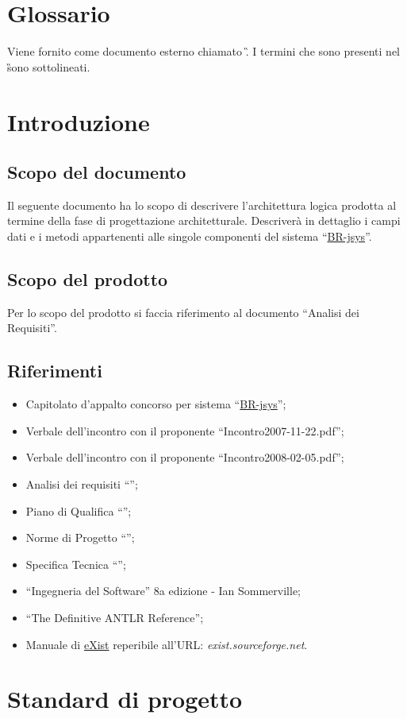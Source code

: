 \chapter*{Glossario}
Viene fornito come documento esterno chiamato \G. I termini che sono presenti nel \G sono sottolineati.

\chapter{Introduzione}
\section{Scopo del documento}
Il seguente documento ha lo scopo di descrivere l'architettura logica prodotta al termine della fase di progettazione architetturale. Descriver\`a in dettaglio i campi dati e i metodi appartenenti alle singole componenti del sistema ``\underline{BR-jsys}''.
\section{Scopo del prodotto}
Per lo scopo del prodotto si faccia riferimento al documento ``Analisi dei Requisiti''.

\section{Riferimenti}
\begin{itemize}
\item Capitolato d'appalto concorso per sistema ``\underline{BR-jsys}'';
\item Verbale dell'incontro con il proponente ``Incontro2007-11-22.pdf'';
\item Verbale dell'incontro con il proponente ``Incontro2008-02-05.pdf'';
\item Analisi dei requisiti ``\AR'';
\item Piano di Qualifica ``\PdQ'';
\item Norme di Progetto ``\NdP'';
\item Specifica Tecnica ``\ST'';
\item ``Ingegneria del Software'' 8a edizione - Ian Sommerville;
\item ``The Definitive ANTLR Reference'';
\item Manuale di \underline{eXist} reperibile all'URL: \textit{exist.sourceforge.net}.
\end{itemize}
\chapter{Standard di progetto}
